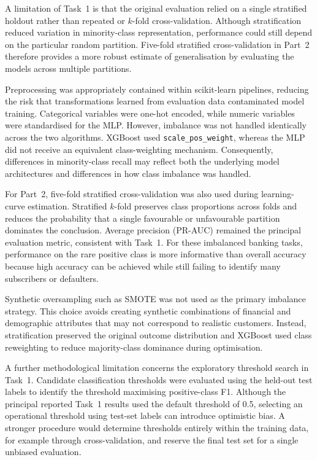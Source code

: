 A limitation of Task~1 is that the original evaluation relied on a single stratified
holdout rather than repeated or $k$-fold cross-validation. Although stratification
reduced variation in minority-class representation, performance could still depend on
the particular random partition. Five-fold stratified cross-validation in Part~2
therefore provides a more robust estimate of generalisation by evaluating the models
across multiple partitions.

Preprocessing was appropriately contained within scikit-learn pipelines, reducing the
risk that transformations learned from evaluation data contaminated model training.
Categorical variables were one-hot encoded, while numeric variables were standardised
for the MLP. However, imbalance was not handled identically across the two algorithms.
XGBoost used \texttt{scale\_pos\_weight}, whereas the MLP did not receive an
equivalent class-weighting mechanism. Consequently, differences in minority-class
recall may reflect both the underlying model architectures and differences in how
class imbalance was handled.

For Part~2, five-fold stratified cross-validation was also used during learning-curve
estimation. Stratified $k$-fold preserves class proportions across folds and reduces
the probability that a single favourable or unfavourable partition dominates the
conclusion. Average precision (PR-AUC) remained the principal evaluation metric,
consistent with Task~1. For these imbalanced banking tasks, performance on the rare
positive class is more informative than overall accuracy because high accuracy can be
achieved while still failing to identify many subscribers or defaulters.

Synthetic oversampling such as SMOTE was not used as the primary imbalance strategy.
This choice avoids creating synthetic combinations of financial and demographic
attributes that may not correspond to realistic customers. Instead, stratification
preserved the original outcome distribution and XGBoost used class reweighting to
reduce majority-class dominance during optimisation.

A further methodological limitation concerns the exploratory threshold search in
Task~1. Candidate classification thresholds were evaluated using the held-out test
labels to identify the threshold maximising positive-class F1. Although the principal
reported Task~1 results used the default threshold of 0.5, selecting an operational
threshold using test-set labels can introduce optimistic bias. A stronger procedure
would determine thresholds entirely within the training data, for example through
cross-validation, and reserve the final test set for a single unbiased evaluation.

